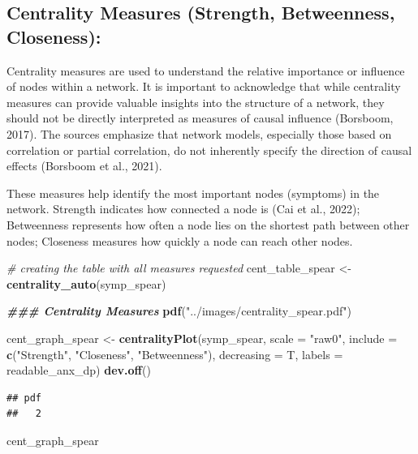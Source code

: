\documentclass[
]{article}
\newenvironment{Shaded}{\begin{snugshade}}{\end{snugshade}}
\newcommand{\AttributeTok}[1]{\textcolor[rgb]{0.13,0.29,0.53}{#1}}
\newcommand{\CommentTok}[1]{\textcolor[rgb]{0.56,0.35,0.01}{\textit{#1}}}
\newcommand{\DocumentationTok}[1]{\textcolor[rgb]{0.56,0.35,0.01}{\textbf{\textit{#1}}}}
\newcommand{\FunctionTok}[1]{\textcolor[rgb]{0.13,0.29,0.53}{\textbf{#1}}}
\newcommand{\NormalTok}[1]{#1}
\newcommand{\OtherTok}[1]{\textcolor[rgb]{0.56,0.35,0.01}{#1}}
\newcommand{\StringTok}[1]{\textcolor[rgb]{0.31,0.60,0.02}{#1}}
\begin{document}
\subsection{Centrality Measures (Strength, Betweenness,
Closeness):}\label{centrality-measures-strength-betweenness-closeness}

Centrality measures are used to understand the relative importance or
influence of nodes within a network. It is important to acknowledge that
while centrality measures can provide valuable insights into the
structure of a network, they should not be directly interpreted as
measures of causal influence (Borsboom, 2017). The sources emphasize
that network models, especially those based on correlation or partial
correlation, do not inherently specify the direction of causal effects
(Borsboom et al., 2021).

These measures help identify the most important nodes (symptoms) in the
network. Strength indicates how connected a node is (Cai et al., 2022);
Betweenness represents how often a node lies on the shortest path
between other nodes; Closeness measures how quickly a node can reach
other nodes.

\begin{Shaded}
\begin{Highlighting}[]
\CommentTok{\# creating the table with all measures requested}
\NormalTok{cent\_table\_spear }\OtherTok{\textless{}{-}} \FunctionTok{centrality\_auto}\NormalTok{(symp\_spear)}

\DocumentationTok{\#\#\# Centrality Measures}
\FunctionTok{pdf}\NormalTok{(}\StringTok{"../images/centrality\_spear.pdf"}\NormalTok{)}

\NormalTok{cent\_graph\_spear }\OtherTok{\textless{}{-}} \FunctionTok{centralityPlot}\NormalTok{(symp\_spear, }\AttributeTok{scale =} \StringTok{"raw0"}\NormalTok{, }\AttributeTok{include =} \FunctionTok{c}\NormalTok{(}\StringTok{"Strength"}\NormalTok{, }\StringTok{"Closeness"}\NormalTok{, }\StringTok{"Betweenness"}\NormalTok{), }\AttributeTok{decreasing =}\NormalTok{ T, }\AttributeTok{labels =}\NormalTok{ readable\_anx\_dp)}
\FunctionTok{dev.off}\NormalTok{()}
\end{Highlighting}
\end{Shaded}

\begin{verbatim}
## pdf 
##   2
\end{verbatim}

\begin{Shaded}
\begin{Highlighting}[]
\NormalTok{cent\_graph\_spear}
\end{Highlighting}
\end{Shaded}
\end{document}
